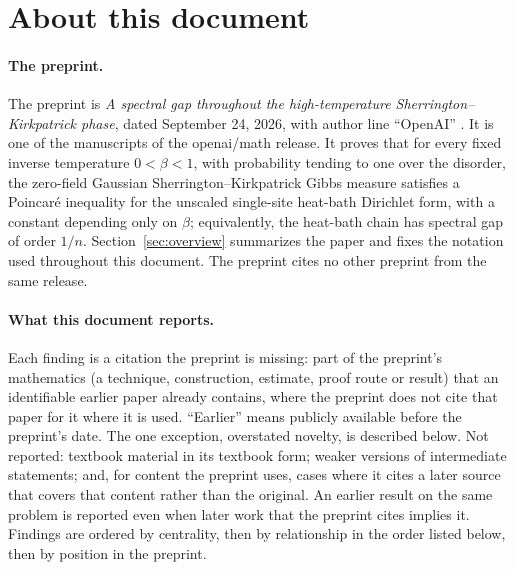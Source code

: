 \documentclass[11pt]{article}
\newcounter{finding}
\begin{document}
\clearpage
\space%

\tableofcontents

\section{About this document}\label{sec:about}

\paragraph{The preprint.}
The preprint is \emph{A spectral gap throughout the high-temperature
Sherrington--Kirkpatrick phase}, dated September 24, 2026, with author line
``OpenAI'' \cite{OAI-Preprint}. It is one of the manuscripts of the openai/math
release. It proves that for every fixed inverse temperature $0<\beta<1$, with
probability tending to one over the disorder, the zero-field Gaussian
Sherrington--Kirkpatrick Gibbs measure satisfies a Poincar\'e inequality for
the unscaled single-site heat-bath Dirichlet form, with a constant depending
only on $\beta$; equivalently, the heat-bath chain has spectral gap of order
$1/n$. Section~\ref{sec:overview} summarizes the paper and fixes the notation
used throughout this document. The preprint cites no other preprint from the
same release.

\paragraph{What this document reports.}
Each finding is a citation the preprint is missing: part of the preprint's
mathematics (a technique, construction, estimate, proof route or result) that
an identifiable earlier paper already contains, where the preprint does not
cite that paper for it where it is used. ``Earlier'' means publicly available
before the preprint's date. The one exception, overstated novelty, is
described below. Not reported: textbook material in its textbook form; weaker versions of
intermediate statements; and, for content the preprint uses, cases where it
cites a later source that covers that content rather than the original. An
earlier result on the same problem is reported even when later work that the
preprint cites implies it. Findings are ordered by centrality, then by relationship in
the order listed below, then by position in the preprint.
\end{document}
